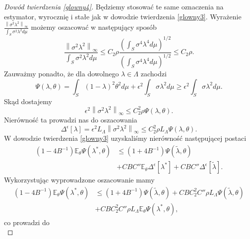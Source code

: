 \documentclass[man,mfiu]{mgrwms}
\newcommand{\norm}[1]{\left\lVert#1\right\rVert}
\begin{document}
\begin{proof}[Dowód twierdzenia \ref{glowny4}] 
Będziemy stosować te same oznaczenia na estymator, wyrocznię i stałe jak w dowodzie twierdzenia \ref{glowny3}. 
Wyrażenie $\frac{\norm{\sigma^2\lambda^2}_{\infty}}{\int_S\sigma^2\lambda^2 d\mu}$ możemy oszacować w następujący sposób
\begin{displaymath}
\frac{\norm{\sigma^2\lambda^2}_{\infty}}{\int_S\sigma^2\lambda^2 d\mu}\leq C_2\rho \frac{\left(\int_S\sigma^4\lambda^4 d\mu\right)^{1/2}}{\left(\int_S\sigma^4\lambda^4 d\mu\right)^{1/2}}\leq C_2\rho.
\end{displaymath}
Zauważmy ponadto, że dla dowolnego $\lambda\in \Lambda$ zachodzi
\begin{displaymath}
\Psi(\lambda,\theta)=\int_S(1-\lambda)^2\theta ^2 d\mu+\epsilon^2\int_S\sigma\lambda^2 d\mu\geq \epsilon^2\int_S\sigma\lambda^2 d\mu.
\end{displaymath}
Skąd dostajemy
\begin{displaymath}
\epsilon^2\norm{\sigma^2\lambda^2}_{\infty}\leq C_2^2 \rho\Psi(\lambda,\theta).
\end{displaymath}
Nierówność ta prowadzi nas do oszacowania
\begin{displaymath}
\Delta^{\epsilon}[\lambda]=\epsilon^2L_{\Lambda}\norm{\sigma^2\lambda^2}_{\infty}\leq C_2^2\rho L_{\Lambda}\Psi(\lambda,\theta).
\end{displaymath}
W dowodzie twierdzenia \ref{glowny3} uzyskaliśmy nierówność następującej postaci
\begin{displaymath}
\begin{split}
(1-4B^{-1})\mathbb{E}_{\theta}\Psi(\lambda^*,\theta)&\leq (1+4B^{-1})\Psi(\tilde{\lambda},\theta) \\
&+CBC''\mathbb{E}_{\theta}\Delta^{\epsilon}[\lambda^*]+CBC''\Delta^{\epsilon}[\tilde{\lambda}].
\end{split}
\end{displaymath}
Wykorzystując wyprowadzone oszacowanie mamy 
\begin{displaymath}
\begin{split}
(1-4B^{-1})\mathbb{E}_{\theta}\Psi(\lambda^*,\theta)&\leq (1+4B^{-1})\Psi(\tilde{\lambda},\theta)+CBC_2^2C''\rho L_{\Lambda}\Psi(\tilde{\lambda},\theta)\\
&+CBC_2^2C''\rho L_{\Lambda}\mathbb{E}_{\theta}\Psi(\lambda^*,\theta),
\end{split}
\end{displaymath}
co prowadzi do
\begin{displaymath}

\end{displaymath}
\end{proof}
\end{document}

